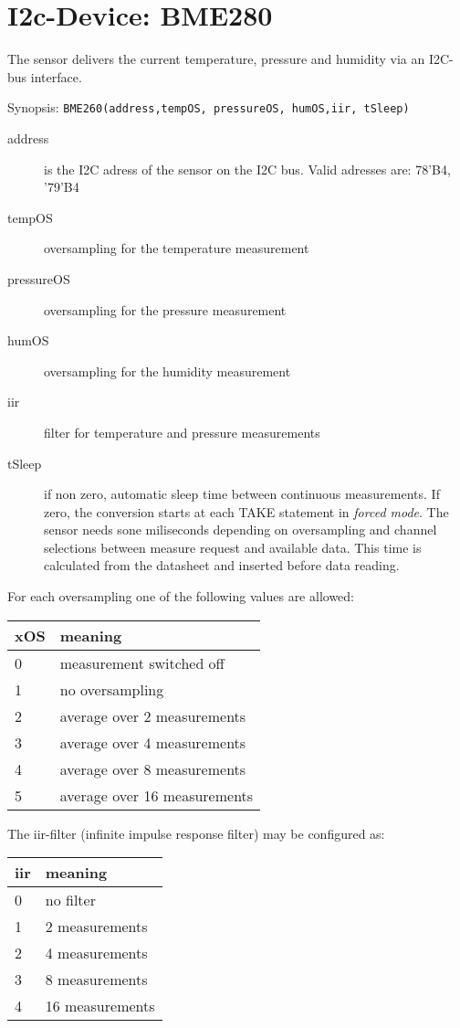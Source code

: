 \section{I2c-Device: BME280}
The sensor delivers the current temperature, pressure and humidity
 via an I2C-bus interface.

Synopsis: \texttt{BME260(address,tempOS, pressureOS, humOS,iir, tSleep)}

\begin{description}
\item[address] is the I2C adress of the sensor on the I2C bus.
   Valid adresses are: 78'B4, '79'B4
\item[tempOS] oversampling for the temperature measurement
\item[pressureOS] oversampling for the pressure measurement
\item[humOS] oversampling for the humidity measurement
\item[iir] filter for temperature and pressure measurements
\item [tSleep] if non zero, automatic sleep time between
 continuous measurements. 
If zero, the conversion starts at each TAKE  statement
 in \textit{forced mode}. The sensor needs sone miliseconds depending
on oversampling and channel selections between measure
 request and available data. This time is calculated from the
  datasheet and inserted before data reading.
\end{description}
For each oversampling one of the following values are allowed:

\begin{tabular}{|l|l|}
\hline
xOS & meaning \\
\hline
0 & measurement switched off\\
1 & no oversampling \\
2 & average over 2 measurements \\
3 & average over 4 measurements \\
4 & average over 8 measurements \\
5 & average over 16 measurements \\
\hline
\end{tabular}

The iir-filter (infinite impulse response filter) may be configured as:

\begin{tabular}{|l|l|}
\hline
iir & meaning \\
\hline
0 & no filter \\
1 & 2 measurements \\
2 & 4 measurements \\
3 & 8 measurements \\
4 & 16 measurements \\
\hline
\end{tabular}

